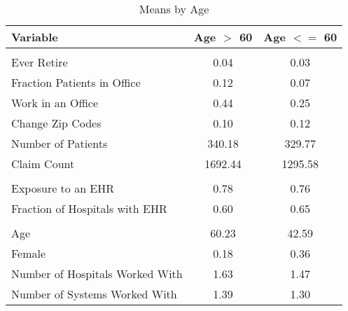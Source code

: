 \begin{table}[ht]

\caption{Means by Age}
\centering
\begin{tabular}[t]{lcc}
\toprule
Variable & Age $>$ 60 & Age $<=$ 60\\
\midrule
\addlinespace[0.3em]
\multicolumn{3}{l}{\textbf{Outcomes}}\\
\hspace{1em}Ever Retire & 0.04 & 0.03\\
\hspace{1em}Fraction Patients in Office & 0.12 & 0.07\\
\hspace{1em}Work in an Office & 0.44 & 0.25\\
\hspace{1em}Change Zip Codes & 0.10 & 0.12\\
\hspace{1em}Number of Patients & 340.18 & 329.77\\
\hspace{1em}Claim Count & 1692.44 & 1295.58\\
\addlinespace[0.3em]
\multicolumn{3}{l}{\textbf{Treatment}}\\
\hspace{1em}Exposure to an EHR & 0.78 & 0.76\\
\hspace{1em}Fraction of Hospitals with EHR & 0.60 & 0.65\\
\addlinespace[0.3em]
\multicolumn{3}{l}{\textbf{Characteristics}}\\
\hspace{1em}Age & 60.23 & 42.59\\
\hspace{1em}Female & 0.18 & 0.36\\
\hspace{1em}Number of Hospitals Worked With & 1.63 & 1.47\\
\hspace{1em}Number of Systems Worked With & 1.39 & 1.30\\
\bottomrule
\end{tabular}
\end{table}
\label{tab:splitstats}